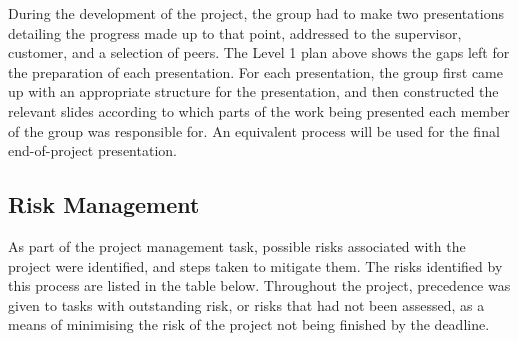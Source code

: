 During the development of the project, the group had to make two presentations
detailing the progress made up to that point, addressed to the supervisor,
customer, and a selection of peers. The Level 1 plan above shows the gaps left
for the preparation of each presentation. For each presentation, the group first
came up with an appropriate structure for the presentation, and then constructed
the relevant slides according to which parts of the work being presented each
member of the group was responsible for. An equivalent process will be used for
the final end-of-project presentation.


\subsection{Risk Management}

As part of the project management task, possible risks associated with the
project were identified, and steps taken to mitigate them. The risks identified
by this process are listed in the table below. Throughout  the
project, precedence was given to tasks with outstanding risk, or risks that had
not been assessed, as a means of minimising the risk of the project not being
finished by the deadline.

